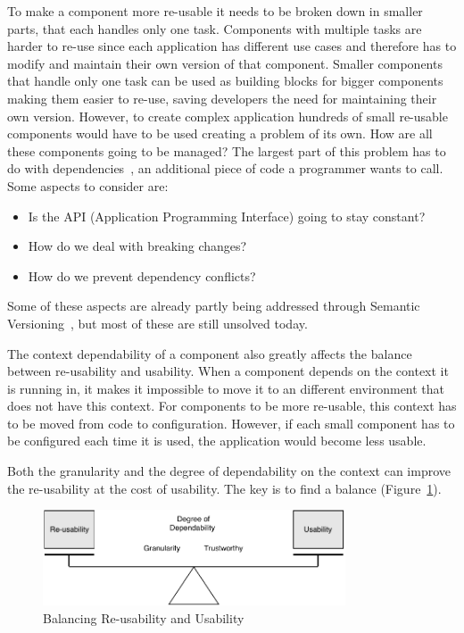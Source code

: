 To make a component more re-usable it needs to be broken down in smaller parts, that each handles only one task. Components with multiple tasks are harder to re-use since each application has different use cases and therefore has to modify and maintain their own version of that component. Smaller components that handle only one task can be used as building blocks for bigger components making them easier to re-use, saving developers the need for maintaining their own version. However, to create complex application hundreds of small re-usable components would have to be used creating a problem of its own. How are all these components going to be managed? The largest part of this problem has to do with dependencies~\cite{reusedreamdead}, an additional piece of code a programmer wants to call. Some aspects to consider are:
\begin{itemize}
	\item Is the API (Application Programming Interface) going to stay constant?
	\item How do we deal with breaking changes?
	\item How do we prevent dependency conflicts?
\end{itemize}

\noindent Some of these aspects are already partly being addressed through Semantic Versioning~\cite{preston2013semantic}, but most of these are still unsolved today.

The context dependability of a component also greatly affects the balance between re-usability and usability. When a component depends on the context it is running in, it makes it impossible to move it to an different environment that does not have this context. For components to be more re-usable, this context has to be moved from code to configuration. However, if each small component has to be configured each time it is used, the application would become less usable.

Both the granularity and the degree of dependability on the context can improve the re-usability at the cost of usability. The key is to find a balance (Figure~\ref{fig:balance-scale}). 

\vspace{0.5cm}

\begin{figure}[h]
	\centering
	\includegraphics[width=0.8\textwidth]{images/balance-scale.pdf}
	\caption{\label{fig:balance-scale} Balancing Re-usability and Usability}
\end{figure}

